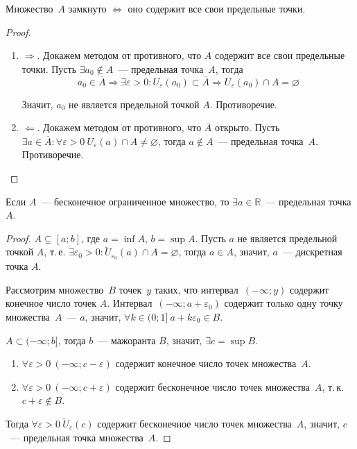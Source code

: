 \begin{statement}
Множество~$A$ замкнуто $\Leftrightarrow$ оно содержит все свои предельные точки.
\end{statement}
\begin{proof}
\begin{enumerate}
	\item $\Rightarrow$. Докажем методом от противного, что $A$ содержит все свои предельные точки.
	Пусть $\exists a_0 \notin A$~--- предельная точка~$A$, тогда
	\begin{equation*}
	a_0 \in \overline A \Rightarrow
	\exists \varepsilon > 0 \colon U_\varepsilon(a_0) \subset \overline A \Rightarrow
	U_\varepsilon(a_0) \cap A = \varnothing
	\end{equation*}
	
	Значит, $a_0$ не является предельной точкой $A$.
	Противоречие.
	
	\item $\Leftarrow$. Докажем методом от противного, что $\overline A$ открыто.
	Пусть $\exists a \in \overline A \colon \forall \varepsilon > 0 \ U_\varepsilon(a) \cap A \neq \varnothing$, тогда $a \notin A$~--- предельная точка~$A$.
	Противоречие.
\end{enumerate}
\end{proof}

\begin{theorem}[Вейерштрасса]
\label{th:Weierstrass}
Если $A$~--- бесконечное ограниченное множество, то $\exists a \in \mathbb R$~--- предельная точка $A$.
\end{theorem}
\begin{proof}
$A \subseteq [a; b]$, где $a = \inf A$, $b = \sup A$.
Пусть $a$ не является предельной точкой $A$, т.\,е. $\exists \varepsilon_0 > 0 \colon \breve U_{\varepsilon_0}(a) \cap A = \varnothing$, тогда $a \in A$, значит, $a$~--- дискретная точка $A$.

Рассмотрим множество~$B$ точек~$y$ таких, что интервал~$(-\infty; y)$ содержит конечное число точек $A$.
Интервал~$(-\infty; a + \varepsilon_0)$ содержит только одну точку множества~$A$~--- $a$, значит, $\forall k \in (0; 1] \ a + k\varepsilon_0 \in B$.

$A \subset (-\infty; b]$, тогда $b$~--- мажоранта $B$, значит, $\exists c = \sup B$.
\begin{enumerate}
	\item $\forall \varepsilon > 0 \ (-\infty; c - \varepsilon)$ содержит конечное число точек множества~$A$.
	\item $\forall \varepsilon > 0 \ (-\infty; c + \varepsilon)$ содержит бесконечное число точек множества~$A$, т.\,к. $c + \varepsilon \notin B$.
\end{enumerate}

Тогда $\forall \varepsilon > 0 \ \breve U_\varepsilon(c)$ содержит бесконечное число точек множества~$A$, значит, $c$~--- предельная точка множества~$A$.
\end{proof}